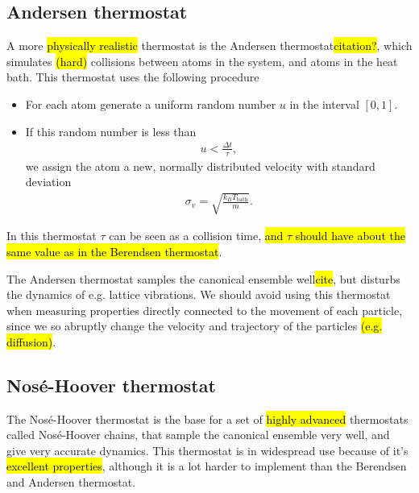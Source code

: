 \subsection{Andersen thermostat}
A more \hl{physically realistic} thermostat is the Andersen thermostat\hl{citation?}, which simulates \hl{(hard)} collisions between atoms in the system, and atoms in the heat bath. This thermostat uses the following procedure
%
\begin{itemize}
    \item For each atom generate a uniform random number $u$ in the interval $[0,1]$.
    \item If this random number is less than
        \begin{align*}
            u < \frac{\Delta t}{\tau},
        \end{align*}
        we assign the atom a new, normally distributed velocity with standard deviation
        \begin{align*}
            \sigma_v = \sqrt{\frac{k_B T_\text{bath}}{m}}.
        \end{align*}
\end{itemize}
%
In this thermostat $\tau$ can be seen as a collision time, \hl{and $\tau$ should have about the same value as in the Berendsen thermostat}.

The Andersen thermostat samples the canonical ensemble well\hl{cite}, but disturbs the dynamics of e.g. lattice vibrations. We should avoid using this thermostat when measuring properties directly connected to the movement of each particle, since we so abruptly change the velocity and trajectory of the particles \hl{(e.g. diffusion)}.

\subsection{Nos\'e-Hoover thermostat}
The Nos\'e-Hoover thermostat\cite{nose1984unified,hoover1985canonical} is the base for a set of \hl{highly advanced} thermostats called Nos\'e-Hoover chains, that sample the canonical ensemble very well, and give very accurate dynamics.  This thermostat is in widespread use because of it's \hl{excellent properties}, although it is a lot harder to implement than the Berendsen and Andersen thermostat.

